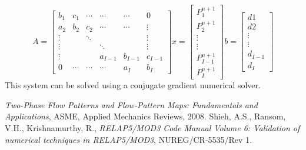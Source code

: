 \documentclass[11pt,letterpaper,titlepage]{article}
\begin{document}
\begin{equation*}
A=
\begin{bmatrix}
b_1    & c_1     & \cdots & \cdots & \cdots & 0      \\
a_2    & b_2     & c_2    & \cdots & \cdots & \vdots \\
\vdots &         & \ddots &        &        & \vdots \\
\vdots &         &        & \ddots &        & \vdots \\
\vdots &         &        &a_{I-1} &b_{I-1} &c_{I-1}  \\
0      & \cdots  & \cdots & \cdots & a_I    & b_I 
\end{bmatrix}
x=
\begin{bmatrix}
P_1^{n+1} \\
P_2^{n+1} \\
\vdots \\
\vdots \\
P_{I-1}^{n+1} \\
P_I^{n+1} 
\end{bmatrix}
b=
\begin{bmatrix}
d1 \\
d2 \\
\vdots \\
\vdots \\
d_{I-1}\\
d_I
\end{bmatrix}
\end{equation*}
\newline
This system can be solved using a conjugate gradient numerical solver.









\newpage
{}
\begin{thebibliography}{1}
	 {\em Two-Phase Flow Patterns and Flow-Pattern Maps: Fundamentals and Applications}, ASME, Applied Mechanics Reviews, 2008.
	 Shieh, A.S., Ransom, V.H., Krishnamurthy, R., {\em RELAP5/MOD3 Code Manual Volume 6: Validation of numerical techniques in RELAP5/MOD3}, NUREG/CR-5535/Rev 1.
\end{thebibliography}
\end{document}
